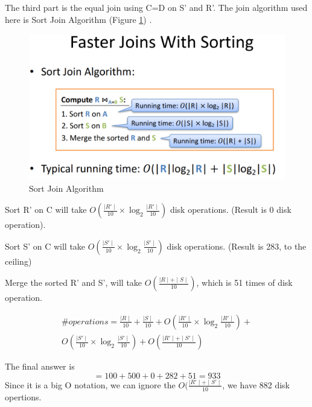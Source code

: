 \documentclass{article}
\begin{document}
\begin{enumerate}[label=(\alph*)]
The third part is the equal join using C=D on S' and R'. The join algorithm used here is Sort Join	Algorithm (Figure \ref{fig:my_label2}) \cite{Chapter329:online}. 
\begin{figure}[H]
    \centering
    \includegraphics[width=14cm]{6.png}
    \caption{Sort Join Algorithm}
    \label{fig:my_label2}
\end{figure}
Sort R' on C will take $O(\frac{\mid R' \mid}{10}\times \log_2 \frac{\mid R' \mid}{10} ) $ disk operations. (Result is 0 disk operation).

Sort S' on C will take $O( \frac{\mid S' \mid}{10} \times \log_2\frac{\mid S' \mid}{10}  ) $ disk operations. (Result is 283, to the ceiling)

Merge the sorted R' and S', will take $O(\frac{\mid R \mid +\mid S \mid }{10})$, which is 51 times of disk operation. 

\begin{multline}
     \# operations=\frac{\mid R \mid}{10}+\frac{\mid S \mid}{10}+O(\frac{\mid R' \mid}{10}\times \log_2 \frac{\mid R' \mid}{10} )+\\O( \frac{\mid S' \mid}{10} \times \log_2\frac{\mid S' \mid}{10}  )+O(\frac{\mid R' \mid +\mid S' \mid }{10})
\end{multline}

   

The final answer is 
\begin{equation}
    =100+500+0+282+51=933
\end{equation}
Since it is a big O notation, we can ignore the $O(\frac{\mid R' \mid +\mid S'\mid }{10}$, we have 882 disk opertions.




\end{enumerate}
\end{document}
